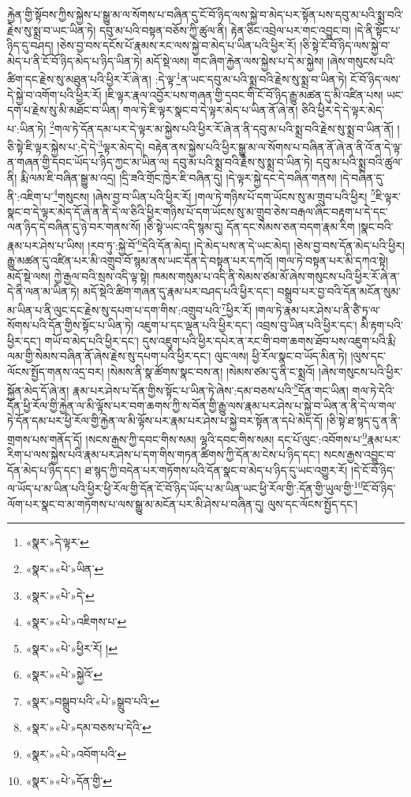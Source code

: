 རྐྱེན་གྱི་སྟོབས་ཀྱིས་སྐྱེས་པ་སྒྱུ་མ་ལ་སོགས་པ་བཞིན་དུ་ངོ་བོ་ཉིད་ལས་སྐྱེ་བ་མེད་པར་སྟོན་པས་དབུ་མ་པའི་སྨྲ་བའི་རྗེས་སུ་སྨྲ་བ་ཡང་ཡིན་ཏེ། དབུ་མ་པའི་བསྟན་བཅོས་ཀྱི་ཚུལ་ནི། རྟེན་ཅིང་འབྲེལ་པར་གང་འབྱུང་བ། །དེ་ནི་སྟོང་པ་ཉིད་དུ་བཤད། །ཅེས་བྱ་བས་དངོས་པོ་རྣམས་རང་ལས་སྐྱེ་བ་མེད་པ་ཡིན་པའི་ཕྱིར་རོ། །ཅི་སྟེ་ངོ་བོ་ཉིད་ལས་སྐྱེ་བ་མེད་པ་ནི་ངོ་བོ་ཉིད་མེད་པ་ཉིད་ཡིན་ཏེ། མདོ་སྡེ་ལས། གང་ཞིག་རྐྱེན་ལས་སྐྱེས་པ་དེ་མ་སྐྱེས། །ཞེས་གསུངས་པའི་ཚིག་དང་རྗེས་སུ་མཐུན་པའི་ཕྱིར་རོ་ཞེ་ན། :དེ་ལྟ་\footnote{«སྣར་»དེ་ལྟར་}ན་ཡང་དབུ་མ་པའི་སྨྲ་བའི་རྗེས་སུ་སྨྲ་བ་ཡིན་ཏེ། ངོ་བོ་ཉིད་ལས་དེ་སྐྱེ་བ་འགོག་པའི་ཕྱིར་རོ། །ཇི་ལྟར་རྣལ་འབྱོར་པས་གཞན་གྱི་དབང་གི་ངོ་བོ་ཉིད་རྒྱུ་མཚན་དུ་མི་འཛིན་པས། ཡང་དག་པ་རྗེས་སུ་མི་མཐོང་བ་ཡིན། གལ་ཏེ་ཇི་ལྟར་སྣང་བ་དེ་ལྟར་མེད་པ་ཡིན་ནོ་ཞེ་ན། ཅིའི་ཕྱིར་དེ་དེ་ལྟར་མེད་པ་:ཡིན་ཏེ། \footnote{«སྣར་»«པེ་»ཡིན་}གལ་ཏེ་དོན་དམ་པར་དེ་ལྟར་མ་སྐྱེས་པའི་ཕྱིར་རོ་ཞེ་ན་ནི་དབུ་མ་པའི་སྨྲ་བའི་རྗེས་སུ་སྨྲ་བ་ཡིན་ནོ། །ཅི་སྟེ་ཇི་ལྟར་སྐྱེས་པ་:དེ་དེ་\footnote{«སྣར་»«པེ་»དེ་}ལྟར་མེད་དེ། བརྟེན་ནས་སྐྱེས་པའི་ཕྱིར་སྒྱུ་མ་ལ་སོགས་པ་བཞིན་ནོ་ཞེ་ན་ནི་འོ་ན་དེ་ལྟ་ན་གཞན་གྱི་དབང་ཡོད་པ་ཉིད་ཀྱང་མ་ཡིན་ལ། དབུ་མ་པའི་སྨྲ་བའི་རྗེས་སུ་སྨྲ་བ་ཡིན་ཏེ། དབུ་མ་པའི་སྨྲ་བའི་ཚུལ་ནི། རྨི་ལམ་ཇི་བཞིན་སྒྱུ་མ་འདྲ། །དྲི་ཟའི་གྲོང་ཁྱེར་ཇི་བཞིན་དུ། །དེ་ལྟར་སྐྱེ་དང་དེ་བཞིན་གནས། །དེ་བཞིན་དུ་ནི་:འཇིག་པ་\footnote{«སྣར་»«པེ་»འཇིགས་པ་}གསུངས། །ཞེས་བྱ་བ་ཡིན་པའི་ཕྱིར་རོ། །གལ་ཏེ་གཉིས་པོ་དག་ཡོངས་སུ་མ་གྲུབ་པའི་ཕྱིར། \footnote{«སྣར་»«པེ་»ཕྱིར་རོ། ། }ཇི་ལྟར་སྣང་བ་དེ་ལྟར་མེད་དོ་ཞེ་ན་ནི་དེ་ལ་ཅིའི་ཕྱིར་གཉིས་པོ་དག་ཡོངས་སུ་མ་གྲུབ་ཅེས་བརྒལ་ཞིང་བརྟག་པ་དེ་དང་ལན་ཉིད་དེ་བཞིན་དུ་ཉེ་བར་གནས་སོ། །ཅི་སྟེ་ཡང་འདི་སྙམ་དུ། དོན་དང་སེམས་ཅན་བདག་རྣམ་རིག །སྣང་བའི་རྣམ་པར་ཤེས་པ་ཡིས། །རབ་ཏུ་:སྐྱེ་བོ་\footnote{«སྣར་»«པེ་»སྐྱེའོ་}དེའི་དོན་མེད། །དེ་མེད་པས་ན་དེ་ཡང་མེད། །ཅེས་བྱ་བས་དོན་མེད་པའི་ཕྱིར། རྒྱུ་མཚན་དུ་འཛིན་པར་མི་འགྲུབ་བོ་སྙམ་ནས་ཡང་དོན་དེ་བསྟན་པར་དཀའོ། །གལ་ཏེ་བསྟན་པར་མི་དཀའ་སྟེ། མདོ་སྡེ་ལས། ཀྱེ་རྒྱལ་བའི་སྲས་འདི་ལྟ་སྟེ། ཁམས་གསུམ་པ་འདི་ནི་སེམས་ཙམ་མོ་ཞེས་གསུངས་པའི་ཕྱིར་རོ་ཞེ་ན་དེ་ནི་ལན་མ་ཡིན་ཏེ། མདོ་སྡེའི་ཚིག་གཞན་དུ་རྣམ་པར་བཤད་པའི་ཕྱིར་དང་། བསྒྲུབ་པར་བྱ་བའི་དོན་མངོན་སུམ་མ་ཡིན་པ་ནི་ལུང་དང་རྗེས་སུ་དཔག་པ་དག་གིས་:འགྲུབ་པའི་\footnote{«སྣར་»བསྒྲུབ་པའི་«པེ་»སྒྲུབ་པའི་}ཕྱིར་རོ། །གལ་ཏེ་རྣམ་པར་ཤེས་པ་ནི་ཙཻ་ཏྲ་ལ་སོགས་པའི་དོན་གྱིས་སྟོང་པ་ཡིན་ཏེ། འཇུག་པ་དང་ལྡན་པའི་ཕྱིར་དང་། འབྲས་བུ་ཡིན་པའི་ཕྱིར་དང་། མི་རྟག་པའི་ཕྱིར་དང་། གཡོ་བ་མེད་པའི་ཕྱིར་དང་། དུས་འཇུག་པའི་ཕྱིར་དཔེར་ན་རང་གི་བག་ཆགས་ཐོབ་པས་འཇུག་པའི་རྨི་ལམ་གྱི་སེམས་བཞིན་ནོ་ཞེས་རྗེས་སུ་དཔག་པའི་ཕྱིར་དང་། ལུང་ལས། ཕྱི་རོལ་སྣང་བ་ཡོད་མིན་ཏེ། །ལུས་དང་ལོངས་སྤྱོད་གནས་འདྲ་བར། །སེམས་ནི་སྣ་ཚོགས་སྣང་བས་ན། །སེམས་ཙམ་དུ་ནི་ང་སྨྲའོ། །ཞེས་གསུངས་པའི་ཕྱིར་སྐྱོན་མེད་དོ་ཞེ་ན། རྣམ་པར་ཤེས་པ་དོན་གྱིས་སྟོང་པ་ཡིན་ཏེ་ཞེས་:དམ་བཅས་པའི་\footnote{«སྣར་»«པེ་»དམ་བཅས་པ་དེའི་}དོན་གང་ཡིན། གལ་ཏེ་དེའི་དོན་ཕྱི་རོལ་གྱི་རྐྱེན་ལ་མི་ལྟོས་པར་བག་ཆགས་ཀྱི་ས་བོན་གྱི་རྒྱུ་ལས་རྣམ་པར་ཤེས་པ་སྐྱེ་བ་ཡིན་ན་ནི་དེ་ལ་གལ་ཏེ་དོན་དམ་པར་ཕྱི་རོལ་གྱི་རྐྱེན་ལ་མི་ལྟོས་པར་རྣམ་པར་ཤེས་པ་སྐྱེ་བར་སྟོན་ན་དཔེ་མེད་དོ། །ཅི་སྟེ་ཐ་སྙད་དུ་ན་ནི་གྲགས་པས་གནོད་དོ། །སངས་རྒྱས་ཀྱི་དབང་གིས་སམ། ལྷའི་དབང་གིས་སམ། དང་པོ་ལུང་:འབོགས་པ་\footnote{«སྣར་»«པེ་»འབོག་པའི་}རྣམ་པར་རིག་པ་ལས་སྐྱེས་པའི་རྣམ་པར་ཤེས་པ་དག་གིས་གཏན་ཚིགས་ཀྱི་དོན་མ་ངེས་པ་ཉིད་དང་། སངས་རྒྱས་འབྱུང་བ་དོན་མེད་པ་ཉིད་དང་། ཐ་སྙད་ཀྱི་བདེན་པར་གཏོགས་པའི་དོན་སྣང་བ་མེད་པ་ཉིད་དུ་ཡང་འགྱུར་རོ། །དེ་ངོ་བོ་ཉིད་ལ་ཡོད་པ་མ་ཡིན་པའི་ཕྱིར་ཕྱི་རོལ་གྱི་དོན་ངོ་བོ་ཉིད་ཡོད་པ་མ་ཡིན་ཡང་ཕྱི་རོལ་གྱི་:དོན་གྱི་ཡུལ་གྱི་\footnote{«སྣར་»«པེ་»དོན་གྱི་}ངོ་བོ་ཉིད་ལོག་པར་སྣང་བ་མ་གཏོགས་པ་ལས་སྒྱུ་མ་མངོན་པར་མི་ཤེས་པ་བཞིན་དུ། ལུས་དང་ལོངས་སྤྱོད་དང་། 